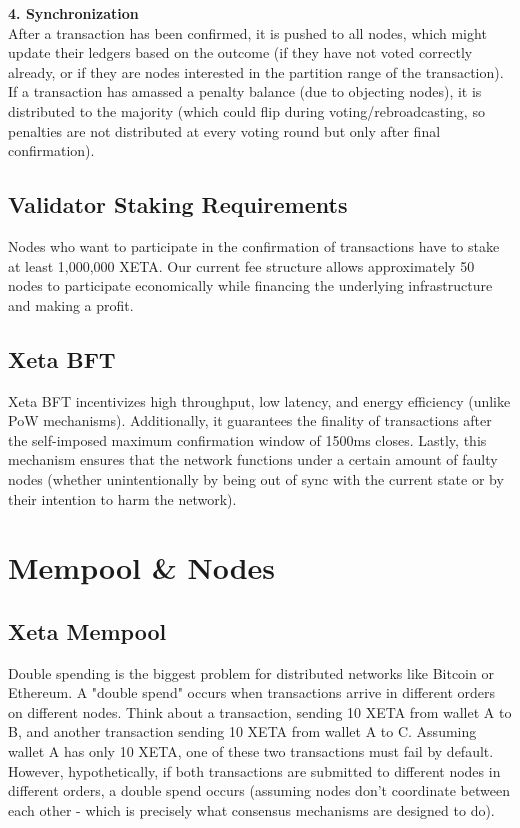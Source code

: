 \documentclass{article}
\begin{document}
\textbf{4. Synchronization}\\
After a transaction has been confirmed, it is pushed to all nodes, which might update their ledgers based on the outcome (if they have not voted correctly already, or if they are nodes interested in the partition range of the transaction). If a transaction has amassed a penalty balance (due to objecting nodes), it is distributed to the majority (which could flip during voting/rebroadcasting, so penalties are not distributed at every voting round but only after final confirmation).

\subsection{Validator Staking Requirements}
Nodes who want to participate in the confirmation of transactions have to stake at least 1,000,000 XETA. Our current fee structure allows approximately 50 nodes to participate economically while financing the underlying infrastructure and making a profit.

\subsection{Xeta BFT}
Xeta BFT incentivizes high throughput, low latency, and energy efficiency (unlike PoW mechanisms). Additionally, it guarantees the finality of transactions after the self-imposed maximum confirmation window of 1500ms closes. Lastly, this mechanism ensures that the network functions under a certain amount of faulty nodes (whether unintentionally by being out of sync with the current state or by their intention to harm the network).

\section{Mempool \& Nodes}
\subsection{Xeta Mempool}
Double spending is the biggest problem for distributed networks like Bitcoin or Ethereum. A "double spend" occurs when transactions arrive in different orders on different nodes. Think about a transaction, sending 10 XETA from wallet A to B, and another transaction sending 10 XETA from wallet A to C. Assuming wallet A has only 10 XETA, one of these two transactions must fail by default. However, hypothetically, if both transactions are submitted to different nodes in different orders, a double spend occurs (assuming nodes don't coordinate between each other - which is precisely what consensus mechanisms are designed to do).
\bigskip
\end{document}

